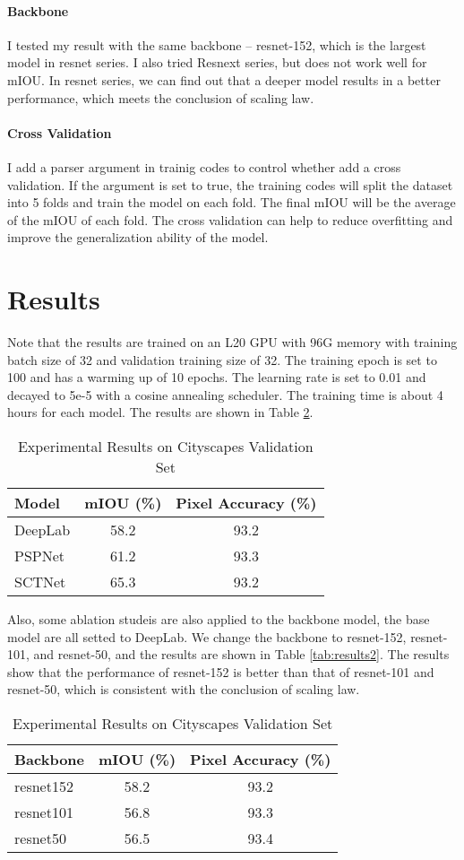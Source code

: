 \documentclass[a4 paper,12pt]{article}
\theoremstyle{definitionstyle}
\begin{document}
\paragraph{Backbone}
I tested my result with the same backbone -- resnet-152, which is the largest model in resnet series. I also tried Resnext series,  but does not work well for mIOU. In resnet series, we can find out that a deeper model results in a better performance, which meets the conclusion of scaling law.
\paragraph{Cross Validation}
I add a parser argument in trainig codes to control whether add a cross validation. If the argument is set to true, the training codes will split the dataset into 5 folds and train the model on each fold. The final mIOU will be the average of the mIOU of each fold. The cross validation can help to reduce overfitting and improve the generalization ability of the model.
\section*{Results}
Note that the results are trained on an L20 GPU with 96G memory with training batch size of 32 and validation training size of 32. The training epoch is set to 100 and has a warming up of 10 epochs. The learning rate is set to 0.01 and decayed to 5e-5 with a cosine annealing scheduler. The training time is about 4 hours for each model. 
The results are shown in Table \ref{tab:results}.
\begin{table}[H]
  \centering
  \caption{Experimental Results on Cityscapes Validation Set}
  \label{tab:results}
  \begin{tabular}{lcc}
    \toprule
    \textbf{Model} & \textbf{mIOU (\%)} & \textbf{Pixel Accuracy (\%)} \\
    \midrule
    DeepLab   & 58.2 & 93.2 \\
    PSPNet    & 61.2 & 93.3 \\
    SCTNet    & 65.3 & 93.2 \\
    \bottomrule
  \end{tabular}
\end{table}
Also, some ablation studeis are also applied to the backbone model, the base model are all setted to DeepLab. We change the backbone to resnet-152, resnet-101, and resnet-50, and the results are shown in Table \ref{tab:results2}. The results show that the performance of resnet-152 is better than that of resnet-101 and resnet-50, which is consistent with the conclusion of scaling law.
\begin{table}[H]
  \centering
  \caption{Experimental Results on Cityscapes Validation Set}
  \label{tab:results}
  \begin{tabular}{lcc}
    \toprule
    \textbf{Backbone} & \textbf{mIOU (\%)} & \textbf{Pixel Accuracy (\%)} \\
    \midrule
    resnet152   & 58.2 & 93.2 \\
    resnet101   & 56.8 & 93.3 \\
    resnet50    & 56.5 & 93.4 \\
    \bottomrule
  \end{tabular}
\end{table}
\end{document}
